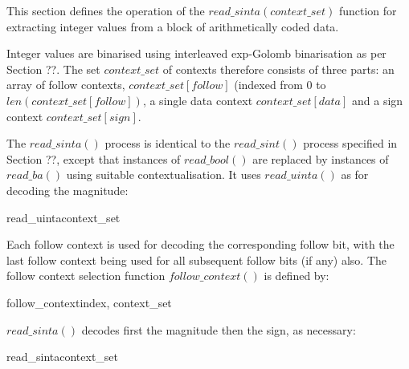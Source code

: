 This section defines the operation of the $read\_sinta(context\_set)$ function
 for extracting integer values from a block of arithmetically coded data.

Integer values are binarised using interleaved exp-Golomb binarisation as per
Section ??. The set $context\_set$ of contexts therefore consists of three parts: 
an array of follow contexts, $context\_set[follow]$ (indexed from 0 to 
$len(context\_set[follow])$, a single data context 
$context\_set[data]$ and a sign context $context\_set[sign]$.

The $read\_sinta()$ process is identical to the $read\_sint()$ process
specified in Section ??, except that instances of $read\_bool()$ are replaced
by instances of $read\_ba()$ using suitable contextualisation. It uses $read\_uinta()$
as for decoding the magnitude:


\begin{pseudo}{read\_uinta}{context\_set}
  \bsEND
\bsEND
{}
\end{pseudo}

Each follow context is used for decoding the corresponding follow bit, with the
last follow context being used for all subsequent follow bits (if any) also. 
The follow context selection function $follow\_context()$ is defined by:

\begin{pseudo}{follow\_context}{index, context\_set}
\end{pseudo}

$read\_sinta()$ decodes first the magnitude then the sign, as necessary:

\begin{pseudo}{read\_sinta}{context\_set}
  \bsEND
\bsEND
\end{pseudo}

